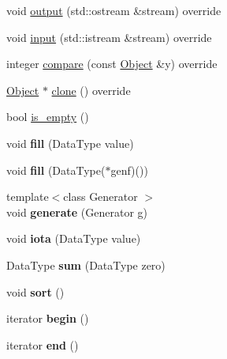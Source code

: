 \begin{DoxyCompactItemize}
\item 
void \hyperlink{classez_1_1objects_1_1Stack_a5df9f4c84fff1e025c094219765d0032}{output} (std\+::ostream \&stream) override
\item 
void \hyperlink{classez_1_1objects_1_1Stack_a3e9796e6bbad1be135c1911e20ec4a8a}{input} (std\+::istream \&stream) override
\item 
integer \hyperlink{classez_1_1objects_1_1Stack_a47b43cce6f59f79ffa0b344c109aae35}{compare} (const \hyperlink{classez_1_1objects_1_1Object}{Object} \&y) override
\item 
\hyperlink{classez_1_1objects_1_1Object}{Object} $\ast$ \hyperlink{classez_1_1objects_1_1Stack_a350a12fecda720df715bf1d773e1a696}{clone} () override
\item 
bool \hyperlink{classez_1_1objects_1_1Stack_a62bd262732579e443d8147d2c2072801}{is\+\_\+empty} ()
\item 
\mbox{\label{classez_1_1objects_1_1Stack_a4414d3d2d13a73911ee1d757b355e8e7}} 
void {\bfseries fill} (Data\+Type value)
\item 
\mbox{\label{classez_1_1objects_1_1Stack_ae001e301e27ddc504dd0cc667983d2a8}} 
void {\bfseries fill} (Data\+Type($\ast$genf)())
\item 
\mbox{\label{classez_1_1objects_1_1Stack_adcc7a36c042ada8b1b2bcd617dbb398e}} 
{\footnotesize template$<$class Generator $>$ }\\void {\bfseries generate} (Generator g)
\item 
\mbox{\label{classez_1_1objects_1_1Stack_ab96e4ada2a46bc2e289db328410336cd}} 
void {\bfseries iota} (Data\+Type value)
\item 
\mbox{\label{classez_1_1objects_1_1Stack_affbb9c01491fcbe1fc851cf56576ce84}} 
Data\+Type {\bfseries sum} (Data\+Type zero)
\item 
\mbox{\label{classez_1_1objects_1_1Stack_a789253aaca87582d927884bff7db493f}} 
void {\bfseries sort} ()
\item 
\mbox{\label{classez_1_1objects_1_1Stack_ae4e2bca96040e0ccf39f16e3ff4518c8}} 
iterator {\bfseries begin} ()
\item 
\mbox{\label{classez_1_1objects_1_1Stack_ae6a56ad1a1a2bfee1bb587ed9f638f31}} 
iterator {\bfseries end} ()
\end{DoxyCompactItemize}
